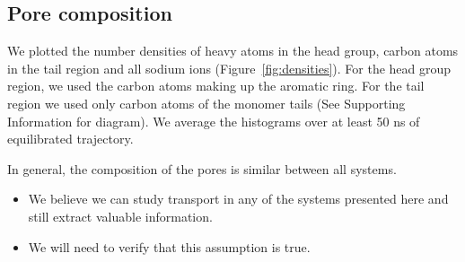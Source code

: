 \documentclass{article}
\begin{document}

  \subsection{Pore composition}
  
  We plotted the number densities of heavy atoms in the head group, carbon atoms in the tail
  region and all sodium ions (Figure~\ref{fig:densities}). For the head group
  region, we used the carbon atoms making up the aromatic ring. For the tail
  region we used only carbon atoms of the monomer tails (See Supporting
  Information for diagram). We average the histograms over at least 50 ns of
  equilibrated trajectory.
  
  In general, the composition of the pores is similar between all systems. 
  \begin{itemize}
  	\item We believe we can study transport in any of the systems presented here and
  	still extract valuable information.
  	\item We will need to verify that this assumption is true.
  \end{itemize}  
  
\end{document}
